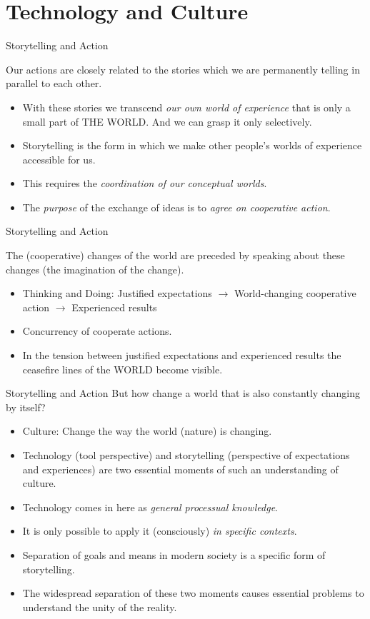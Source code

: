 \documentclass{beamer}
\title{Modelling Sustainable Systems\\ and Semantic Web\\[6pt] Information and
  Language \vskip1em}
\subtitle{Lecture in the Module 10-202-2309\\ for Master Computer Science}
\author{Prof. Dr. Hans-Gert Gräbe\\
\url{http://www.informatik.uni-leipzig.de/~graebe}}
\date{December 2021}
\begin{document}
{
\begin{frame}
  \titlepage
\end{frame}}

\section{Technology and Culture}
\begin{frame}{Storytelling and Action}
  
Our actions are closely related to the stories which we are permanently
telling in parallel to each other.
\begin{itemize}
\item With these stories we transcend \emph{our own world of experience} that
  is only a small part of THE WORLD. And we can grasp it only selectively.
\item Storytelling is the form in which we make other people's worlds of
  experience accessible for us.
\item This requires the \emph{coordination of our conceptual worlds}.
\item The \emph{purpose} of the exchange of ideas is to \emph{agree on
  cooperative action}.
\end{itemize}
\end{frame}
\begin{frame}{Storytelling and Action}

The (cooperative) changes of the world are preceded by speaking about these
changes (the imagination of the change).
\begin{itemize}
\item Thinking and Doing: Justified expectations $\to$ World-changing
  cooperative action $\to$ Experienced results
\item Concurrency of cooperate actions.
\item In the tension between justified expectations and experienced results
  the ceasefire lines of the WORLD become visible.
\end{itemize}
\end{frame}

\begin{frame}{Storytelling and Action}
But how change a world that is also constantly changing by itself?
\begin{itemize}
\item Culture: Change the way the world (nature) is changing.
\item Technology (tool perspective) and storytelling (perspective of
  expectations and experiences) are two essential moments of such an
  understanding of culture.
\item Technology comes in here as \emph{general processual knowledge}. 
\item It is only possible to apply it (consciously) \emph{in specific
  contexts}.
\item Separation of goals and means in modern society is a specific form of
  storytelling.
\item The widespread separation of these two moments causes essential problems
  to understand the unity of the reality.
\end{itemize}
\end{frame}
\end{document}
